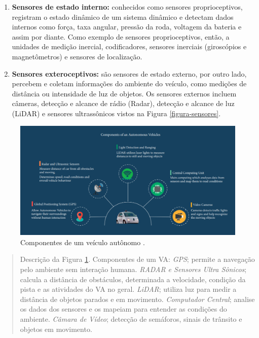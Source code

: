\begin{enumerate}
 \item \textbf{Sensores de estado interno:} conhecidos como sensores proprioceptivos, registram o estado dinâmico de um sistema dinâmico e detectam dados internos como força, taxa angular, pressão da roda, voltagem da bateria e assim por diante. Como exemplo de sensores proprioceptivos, então, a unidades de medição inercial, codificadores, sensores inerciais (giroscópios e magnetômetros) e sensores de localização. 
\item \textbf{Sensores exteroceptivos:} são sensores de estado externo, por outro lado, percebem e coletam informações do ambiente do veículo, como medições de distância ou intensidade de luz de objetos. Os sensores externos incluem câmeras, detecção e alcance de rádio (Radar), detecção e alcance de luz (LiDAR) e sensores ultrassônicos vistos na Figura \ref{figura-sensores}.

\end{enumerate}



\begin{figure}[H]
\centering
\includegraphics[width=\textwidth]{Figures/compo.png}
\caption{Componentes de um veículo autônomo \cite{aplicacao2}.}
\label{figura_compone}
\end{figure}

\begin{quote}
Descrição da Figura \ref{figura_compone}. Componentes de um VA: \textit{GPS}; permite a navegação pelo ambiente sem interação humana. \textit{RADAR e Sensores Ultra Sônicos}; calcula a distância de obstáculos, determinada a velocidade, condição da pista e as atividades do VA no geral. \textit{LiDAR}; utiliza luz para medir a distância de objetos parados e em movimento. \textit{Computador Central}; analise os dados dos sensores e os mapeiam para entender as condições do ambiente. \textit{Câmara de Vídeo}; detecção de semáforos, sinais de trânsito e objetos em movimento.
\end{quote}


